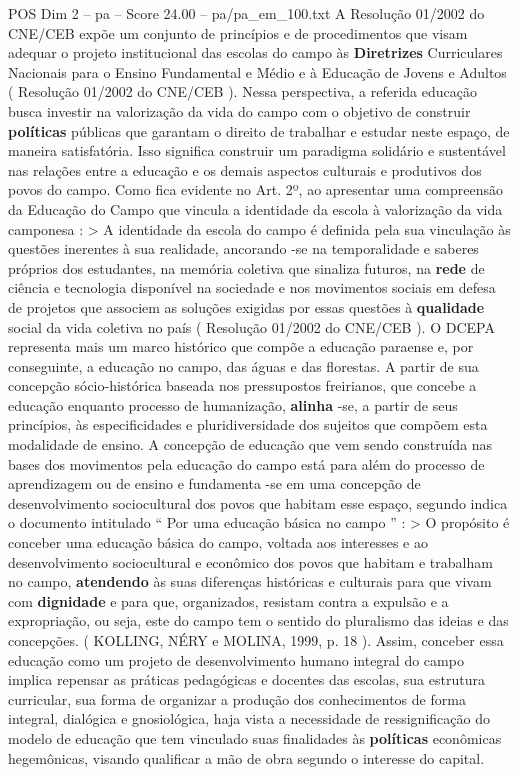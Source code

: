 \begin{textsample}{POS Dim 2 – pa – Score 24.00 – pa/pa\_em\_100.txt}
A Resolução 01/2002 do CNE/CEB expõe um conjunto de princípios e de procedimentos que visam adequar o projeto institucional das escolas do campo às \textbf{Diretrizes} Curriculares Nacionais para o Ensino Fundamental e Médio e à Educação de Jovens e Adultos ( Resolução 01/2002 do CNE/CEB ).
Nessa perspectiva, a referida educação busca investir na valorização da vida do campo com o objetivo de construir \textbf{políticas} públicas que garantam o direito de trabalhar e estudar neste espaço, de maneira satisfatória.
Isso significa construir um paradigma solidário e sustentável nas relações entre a educação e os demais aspectos culturais e produtivos dos povos do campo.
Como fica evidente no Art. 2º, ao apresentar uma compreensão da Educação do Campo que vincula a identidade da escola à valorização da vida camponesa : > A identidade da escola do campo é definida pela sua vinculação às questões inerentes à sua realidade, ancorando -se na temporalidade e saberes próprios dos estudantes, na memória coletiva que sinaliza futuros, na \textbf{rede} de ciência e tecnologia disponível na sociedade e nos movimentos sociais em defesa de projetos que associem as soluções exigidas por essas questões à \textbf{qualidade} social da vida coletiva no país ( Resolução 01/2002 do CNE/CEB ).
O DCEPA representa mais um marco histórico que compõe a educação paraense e, por conseguinte, a educação no campo, das águas e das florestas.
A partir de sua concepção sócio-histórica baseada nos pressupostos freirianos, que concebe a educação enquanto processo de humanização, \textbf{alinha} -se, a partir de seus princípios, às especificidades e pluridiversidade dos sujeitos que compõem esta modalidade de ensino.
A concepção de educação que vem sendo construída nas bases dos movimentos pela educação do campo está para além do processo de aprendizagem ou de ensino e fundamenta -se em uma concepção de desenvolvimento sociocultural dos povos que habitam esse espaço, segundo indica o documento intitulado “ Por uma educação básica no campo ” : > O propósito é conceber uma educação básica do campo, voltada aos interesses e ao desenvolvimento sociocultural e econômico dos povos que habitam e trabalham no campo, \textbf{atendendo} às suas diferenças históricas e culturais para que vivam com \textbf{dignidade} e para que, organizados, resistam contra a expulsão e a expropriação, ou seja, este do campo tem o sentido do pluralismo das ideias e das concepções. ( KOLLING, NÉRY e MOLINA, 1999, p. 18 ).
Assim, conceber essa educação como um projeto de desenvolvimento humano integral do campo implica repensar as práticas pedagógicas e docentes das escolas, sua estrutura curricular, sua forma de organizar a produção dos conhecimentos de forma integral, dialógica e gnosiológica, haja vista a necessidade de ressignificação do modelo de educação que tem vinculado suas finalidades às \textbf{políticas} econômicas hegemônicas, visando qualificar a mão de obra segundo o interesse do capital.

\end{textsample}
